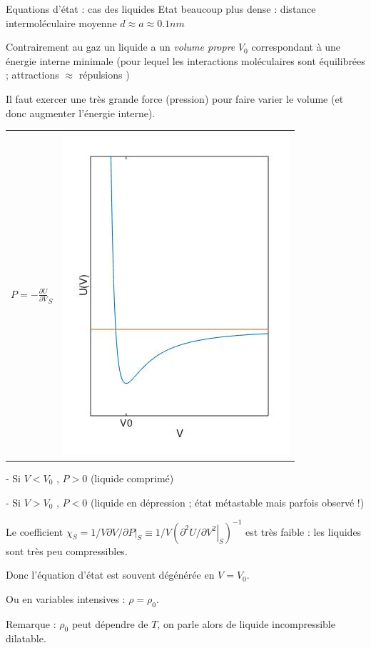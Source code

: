 {\begin{frame}{Equations d'état : cas des liquides}
\small 
Etat beaucoup plus dense : distance intermoléculaire moyenne $d \approx a \approx 0.1 nm$

\medskip 
Contrairement au gaz un liquide a un {\em volume propre} $V_0$ correspondant à une énergie interne minimale (pour lequel les interactions moléculaires sont équilibrées ; attractions $\approx$ répulsions )

\medskip

Il faut exercer une très grande force (pression) pour faire varier le volume (et donc augmenter l'énergie interne).

\begin{tabular}{ll}
\begin{minipage}{.5\textwidth}
$ P = -\frac{\partial U}{\partial V}_S $
\end{minipage}
&
\includegraphics[width=0.2\linewidth]{Figures/UV_liquide.jpg}

\end{tabular}

\smallskip 
- Si $V<V_0$ , $P>0$ (liquide comprimé)

\smallskip
- Si $V>V_0$ , $P<0$ (liquide en dépression ; état métastable mais parfois observé !)

\medskip 


Le coefficient 
$ \chi_S = 1/V {\left.\partial V/\partial P\right|}_S \equiv  1/V \left( {\left.\partial^2 U/\partial V^2\right|}_S \right)^{-1}$ 
est très faible : les liquides sont très peu compressibles.

\medskip

Donc l'équation d'état est souvent dégénérée en  $V = V_0$.




\medskip

Ou en variables intensives : $\rho = \rho_0$.

\medskip



Remarque : $\rho_0$ peut dépendre de $T$, on parle alors de liquide incompressible dilatable.



\end{frame}}
